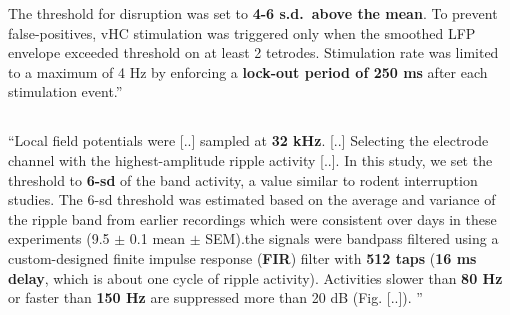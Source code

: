 \begin{quotebar}
The threshold for disruption was set to \textbf{4-6 s.d.\ above the mean}. To prevent false-positives, vHC stimulation was triggered only when the smoothed LFP envelope exceeded threshold on at least 2 tetrodes. Stimulation rate was limited to a maximum of 4 Hz by enforcing a \textbf{lock-out period of 250 ms} after each stimulation event.'' \cite{Jadhav2012}
\end{quotebar}


\subsection{}

\begin{quotebar}
``Local field potentials were [..] sampled at \textbf{32 kHz}. [..] Selecting the electrode channel with the highest-amplitude ripple activity [..].  In this study, we set the threshold to \textbf{6-sd} of the band activity, a value similar to rodent interruption studies. The 6-sd threshold was estimated based on the average and variance of the ripple band from earlier recordings which were consistent over days in these experiments (9.5 $\pm$ 0.1 \uV{} mean $\pm$ SEM).\newline
[..] the signals were bandpass filtered using a custom-designed finite impulse response (\textbf{FIR}) filter with \textbf{512 taps} (\textbf{16 ms delay}, which is about one cycle of ripple activity).\footnotemark{} Activities slower than \textbf{80 Hz} or faster than \textbf{150 Hz} are suppressed more than 20 dB (Fig. [..]). '' \cite{Talakoub2016}
\end{quotebar}



\subsection{}

